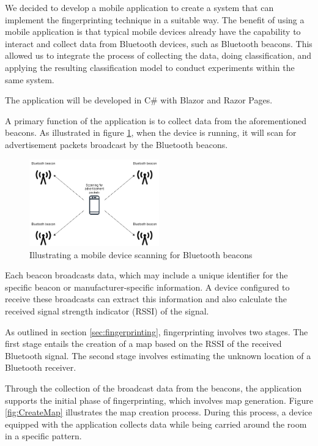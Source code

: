 We decided to develop a mobile application to create a system that can implement the fingerprinting technique in a suitable way.
The benefit of using a mobile application is that typical mobile devices already have the capability to interact and collect data from Bluetooth devices, such as Bluetooth beacons. 
This allowed us to integrate the process of collecting the data, doing classification, and applying the resulting classification model to conduct experiments within the same system.

The application will be developed in C#\cite{billwagnerDocsGetStarted} with Blazor\cite{BlazorBuildClient} and Razor Pages\cite{tdykstraIntroductionRazorPages2023}.

A primary function of the application is to collect data from the aforementioned beacons. 
As illustrated in figure \ref{fig:ScanAdvertisement}, when the device is running, it will scan for advertisement packets broadcast by the Bluetooth beacons.

\begin{figure}[H]
    \centering
    \includegraphics[width=0.5\textwidth]{images/ScanningForAdvertisement.drawio.png}
    \caption{Illustrating a mobile device scanning for Bluetooth beacons}
    \label{fig:ScanAdvertisement}
\end{figure}

Each beacon broadcasts data, which may include a unique identifier for the specific beacon or manufacturer-specific information.
A device configured to receive these broadcasts can extract this information and also calculate the received signal strength indicator (RSSI) of the signal.

As outlined in section \ref{sec:fingerprinting}, fingerprinting involves two stages.
The first stage entails the creation of a map based on the RSSI of the received Bluetooth signal. The second stage involves estimating the unknown location of a Bluetooth receiver.

Through the collection of the broadcast data from the beacons, the application supports the initial phase of fingerprinting, which involves map generation.
Figure \ref{fig:CreateMap} illustrates the map creation process. During this process, a device equipped with the application collects data while being carried around the room in a specific pattern.

